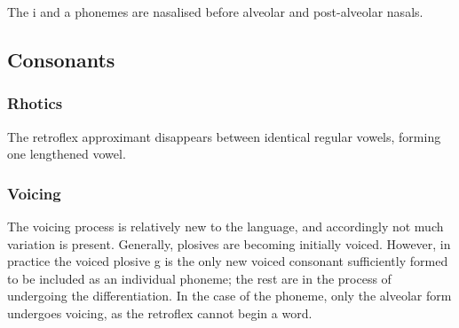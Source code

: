 
The i and a phonemes are nasalised before alveolar and post-alveolar nasals.

%

\subsection{Consonants}

\subsubsection{Rhotics}

The retroflex approximant \textipa{\textturnrrtail} disappears between identical
regular vowels, forming one lengthened vowel.

%
\subsubsection{Voicing}

The voicing process is relatively new to the language, and accordingly not much
variation is present. Generally, plosives are becoming initially voiced.
However, in practice the voiced plosive g is the only new voiced consonant
sufficiently formed to be included as an individual phoneme; the rest are in the
process of undergoing the differentiation. In the case of the \textipa{\|]{t}}
phoneme, only the alveolar form undergoes voicing, as the retroflex cannot begin
a word.


